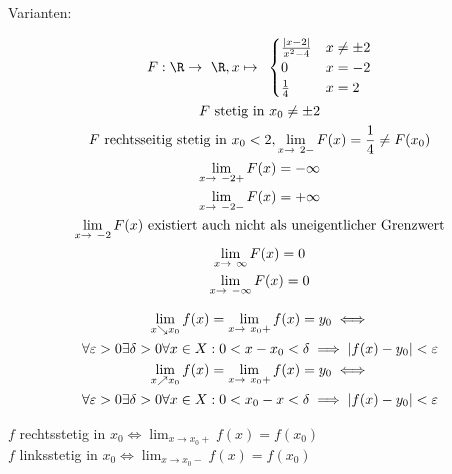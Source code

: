 Varianten:\\
\begin{bsp*}
	\begin{gather*}
		F: \R \rightarrow \R , x \mapsto \begin{cases}
			\frac{\abs{x-2}}{x^2-4}	&x \neq \pm 2	\\
			0					&x = -2		\\
			\frac{1}{4}				&x = 2		
		\end{cases}\\
		F \text{ stetig in } x_0 \neq \pm 2 \\
		F \text{ rechtsseitig stetig in } x_0 < 2 , \lim_{x \rightarrow 2 -} F(x) = \frac{1}{4} \neq F(x_0) \\
		\lim_{x \rightarrow -2 +} F(x) = -\infty \\
		\lim_{x \rightarrow -2 -} F(x) = +\infty \\
		\lim_{x \rightarrow -2} F(x) \text{ existiert auch nicht als uneigentlicher Grenzwert} \\
		\lim_{x \rightarrow \infty} F(x) = 0 \\
		\lim_{x \rightarrow -\infty} F(x) = 0
	\end{gather*}
\end{bsp*}
\begin{def*}[note = Einseitige Grenzwerte , index = Grenzwert!einseitiger]
	\begin{gather*}
		\lim_{x \searrow x_0} f(x) = \lim_{x \rightarrow x_0 +} f(x) = y_0 \iff \\
		\forall \epsilon > 0 \exists \delta > 0 \forall x \in X : 0 < x - x_0 < \delta \implies \abs{f(x) - y_0} < \epsilon \\
		\lim_{x \nearrow x_0} f(x) = \lim_{x \rightarrow x_0 +} f(x) = y_0 \iff \\
		\forall \epsilon > 0 \exists \delta > 0 \forall x \in X : 0 < x_0 - x < \delta \implies \abs{f(x) - y_0} < \epsilon
	\end{gather*}
\end{def*}
\begin{bem}
	$f$ rechtsstetig in $x_0 \iff \lim_{x \rightarrow x_0 +} f(x) = f(x_0)$ \\
	$f$ linksstetig in $x_0 \iff \lim_{x \rightarrow x_0 -} f(x) = f(x_0)$
\end{bem}
